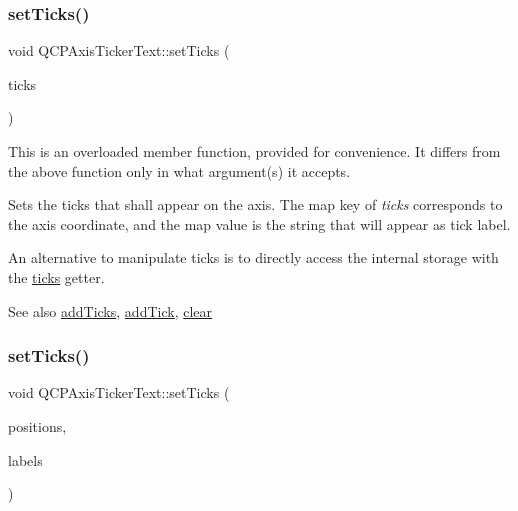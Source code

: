 \subsubsection{\texorpdfstring{set\+Ticks()}{setTicks()}\hspace{0.1cm}{\footnotesize\ttfamily [1/2]}}
{\footnotesize\ttfamily void Q\+C\+P\+Axis\+Ticker\+Text\+::set\+Ticks (\begin{DoxyParamCaption}\item[{const Q\+Map$<$ double, Q\+String $>$ \&}]{ticks }\end{DoxyParamCaption})}

This is an overloaded member function, provided for convenience. It differs from the above function only in what argument(s) it accepts.

Sets the ticks that shall appear on the axis. The map key of {\itshape ticks} corresponds to the axis coordinate, and the map value is the string that will appear as tick label.

An alternative to manipulate ticks is to directly access the internal storage with the \hyperlink{classQCPAxisTickerText_ac84622a6bb4f2a98474e185ecaf3189a}{ticks} getter.

\begin{DoxySeeAlso}{See also}
\hyperlink{classQCPAxisTickerText_aba34051300eecaefbedb2df8feff2d45}{add\+Ticks}, \hyperlink{classQCPAxisTickerText_a3362873a48614e6d446c193548cb85e3}{add\+Tick}, \hyperlink{classQCPAxisTickerText_a21826d2fcd9a25c194d34d4f67aa1460}{clear} 
\end{DoxySeeAlso}
\mbox{\label{classQCPAxisTickerText_a686f38f358a0cf2d9309c84c22581d9b}} 
\subsubsection{\texorpdfstring{set\+Ticks()}{setTicks()}\hspace{0.1cm}{\footnotesize\ttfamily [2/2]}}
{\footnotesize\ttfamily void Q\+C\+P\+Axis\+Ticker\+Text\+::set\+Ticks (\begin{DoxyParamCaption}\item[{const Q\+Vector$<$ double $>$ \&}]{positions,  }\item[{const Q\+Vector$<$ Q\+String $>$ \&}]{labels }\end{DoxyParamCaption})}

